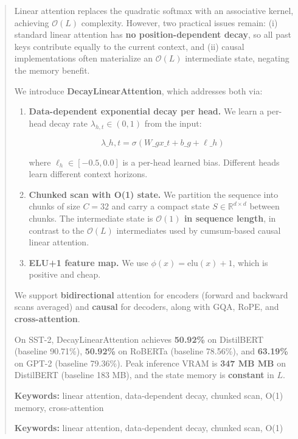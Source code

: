 \documentclass{article}
\begin{document}
\maketitle

\begin{abstract}
Linear attention replaces the quadratic softmax with an associative kernel, 
achieving $\mathcal{O}(L)$ complexity. However, two practical issues remain: 
(i) standard linear attention has \textbf{no position-dependent decay}, so all 
past keys contribute equally to the current context, and (ii) causal 
implementations often materialize an $\mathcal{O}(L)$ intermediate state, 
negating the memory benefit.

We introduce \textbf{DecayLinearAttention}, which addresses both via:

\begin{enumerate}
\item \textbf{Data-dependent exponential decay per head.} We learn a per-head decay
  rate $\lambda_{h,t} \in (0, 1)$ from the input:
  
  $$
  \lambda\_{h,t} = \sigma\!\left(W\_g x\_t + b\_g + \ell\_h\right)
  $$
  
  where $\ell_h \in [-0.5, 0.0]$ is a per-head
  learned bias. Different heads learn different context horizons.
\item \textbf{Chunked scan with O(1) state.} We partition the sequence into chunks
  of size $C = 32$ and carry a compact state
  $S \in \mathbb{R}^{d \times d}$ between chunks. The intermediate state is
  \textbf{$\mathcal{O}(1)$ in sequence length}, in contrast to the
  $\mathcal{O}(L)$ intermediates used by cumsum-based causal linear
  attention.
\item \textbf{ELU+1 feature map.} We use $\phi(x) = \text{elu}(x) + 1$, which is
  positive and cheap.

\end{enumerate}
We support \textbf{bidirectional} attention for encoders (forward and backward 
scans averaged) and \textbf{causal} for decoders, along with GQA, RoPE, and 
\textbf{cross-attention}.

On SST-2, DecayLinearAttention achieves \textbf{50.92\%} on DistilBERT 
(baseline 90.71\%), \textbf{50.92\%} on RoBERTa (baseline 78.56\%), 
and \textbf{63.19\%} on GPT-2 (baseline 79.36\%). Peak inference VRAM is 
\textbf{347 MB MB} on DistilBERT (baseline 183 MB), and the state 
memory is \textbf{constant} in $L$.

\textbf{Keywords:} linear attention, data-dependent decay, chunked scan, O(1) 
memory, cross-attention



\vspace{0.5em}
\noindent\textbf{Keywords:} linear attention, data-dependent decay, chunked scan, O(1)
\end{abstract}
\end{document}
